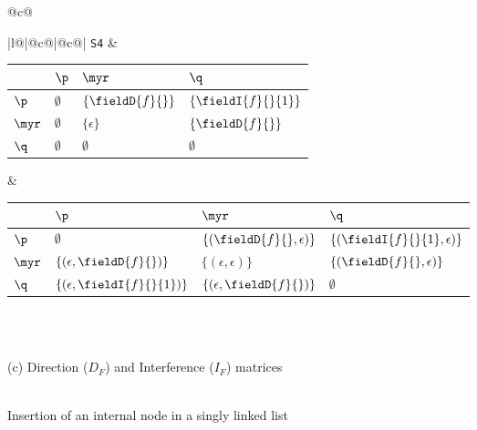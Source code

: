 \begin{figure}
{\begin{tabular}{@{}c@{}}
{\begin{tabular}[b]{|l@{}|@{}c@{}|@{}c@{}|}
{\tt S4} & 
\begin{tabular}{|p{3mm}|p{12mm}p{12mm}p{12mm}|} \hline 
            & $\p$  		& $\myr$ 		& $\q$ 	 \\ \hline
  $\p$ 	& $\emptyset$	& $\{\fieldD{f}{}\}$	& $\{\fieldI{f}{}{1}\}$ \\ \hline
  $\myr$ 	& $\emptyset$	& $\{\epsilon\}$	& $\{\fieldD{f}{}\}$	\\ \hline
  $\q$ 		& $\emptyset$	& $\emptyset$	& $\emptyset$	\\ \hline
\end{tabular}
 &
\begin{tabular}{|p{3mm}|p{28mm}p{28mm}p{28mm}|} \hline 
            & $\p$  		& $\myr$ 		& $\q$ 	 \\ \hline
  $\p$ 	& $\emptyset$	& $\{(\fieldD{f}{}, \epsilon)\}$	& $\{(\fieldI{f}{}{1}, \epsilon)\}$ \\ \hline
  $\myr$ 	& $\{(\epsilon, \fieldD{f}{})\}$	& $\{(\epsilon, \epsilon)\}$	& $\{(\fieldD{f}{}, \epsilon)\}$	\\ \hline
  $\q$ 		& $\{(\epsilon, \fieldI{f}{}{1})\}$	& $\{(\epsilon, \fieldD{f}{})\}$	& $\emptyset$	\\ \hline
\end{tabular} \\ \hline
\end{tabular} 
}  \\
  \footnotesize (c) Direction ($D_F$) and Interference ($I_F$) matrices  \\ \\
\end{tabular}}
\caption{Insertion of an internal node in a singly linked list\label{fig:benchmark_1}}
\end{figure}
